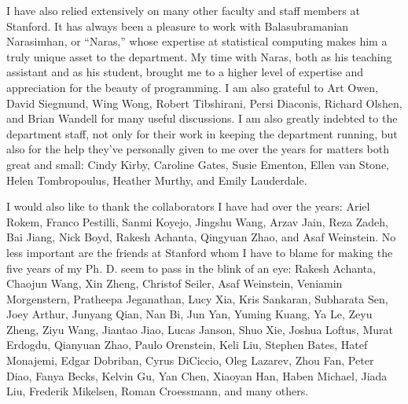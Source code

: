 \documentclass[12pt]{report}
\begin{document}
I have also relied extensively on many other faculty and staff members
at Stanford.  It has always been a pleasure to work with
Balasubramanian Narasimhan, or ``Naras,'' whose expertise at
statistical computing makes him a truly unique asset to the
department.  My time with Naras, both as his teaching assistant and as
his student, brought me to a higher level of expertise and
appreciation for the beauty of programming.  I am also grateful to Art
Owen, David Siegmund, Wing Wong, Robert Tibshirani, Persi Diaconis,
Richard Olshen, and Brian Wandell for many useful discussions.  I am
also greatly indebted to the department staff, not only for their work
in keeping the department running, but also for the help they've
personally given to me over the years for matters both great and
small: Cindy Kirby, Caroline Gates, Susie Ementon, Ellen van Stone,
Helen Tombropoulus, Heather Murthy, and Emily Lauderdale.

I would also like to thank the collaborators I have had over the
years: Ariel Rokem, Franco Pestilli, Sanmi Koyejo, Jingshu Wang, Arzav
Jain, Reza Zadeh, Bai Jiang, Nick Boyd, Rakesh Achanta, Qingyuan Zhao,
and Asaf Weinstein.  No less important are the friends at Stanford
whom I have to blame for making the five years of my Ph. D. seem to
pass in the blink of an eye: Rakesh Achanta, Chaojun Wang, Xin Zheng,
Christof Seiler, Asaf Weinstein, Veniamin Morgenstern, Pratheepa
Jeganathan, Lucy Xia, Kris Sankaran, Subharata Sen, Joey Arthur,
Junyang Qian, Nan Bi, Jun Yan, Yuming Kuang, Ya Le, Zeyu Zheng, Ziyu
Wang, Jiantao Jiao, Lucas Janson, Shuo Xie, Joshua Loftus, Murat
Erdogdu, Qianyuan Zhao, Paulo Orenstein, Keli Liu, Stephen Bates,
Hatef Monajemi, Edgar Dobriban, Cyrus DiCiccio, Oleg Lazarev, Zhou
Fan, Peter Diao, Fanya Becks, Kelvin Gu, Yan Chen, Xiaoyan Han, Haben
Michael, Jiada Liu, Frederik Mikelsen, Roman Croessmann, and many
others.
\end{document}
